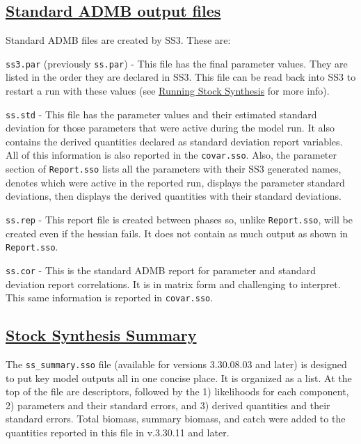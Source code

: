 \hypertarget{ADMBOutput}{}
\subsection[Standard ADMB output files]{\protect\hyperlink{ADMBOutput}{Standard ADMB output files}}
Standard ADMB files are created by SS3. These are:

\texttt{ss3.par} (previously \texttt{ss.par}) - This file has the final parameter values. They are listed in the order they are declared in SS3. This file can be read back into SS3 to restart a run with these values (see \hyperref[sec:RunningSS3]{Running Stock Synthesis} for more info).

\texttt{ss.std} - This file has the parameter values and their estimated standard deviation for those parameters that were active during the model run. It also contains the derived quantities declared as standard deviation report variables. All of this information is also reported in the \texttt{covar.sso}. Also, the parameter section of \texttt{Report.sso} lists all the parameters with their SS3 generated names, denotes which were active in the reported run, displays the parameter standard deviations, then displays the derived quantities with their standard deviations.

\texttt{ss.rep} - This report file is created between phases so, unlike \texttt{Report.sso}, will be created even if the hessian fails. It does not contain as much output as shown in \texttt{Report.sso}.

\texttt{ss.cor} - This is the standard ADMB report for parameter and standard deviation report correlations. It is in matrix form and challenging to interpret. This same information is reported in \texttt{covar.sso}.

\hypertarget{SS3Summary}{}
\subsection[Stock Synthesis Summary]{\protect\hyperlink{SS3Summary}{Stock Synthesis Summary}}
The \texttt{ss\_summary.sso} file (available for versions 3.30.08.03 and later) is designed to put key model outputs all in one concise place. It is organized as a list. At the top of the file are descriptors, followed by the 1) likelihoods for each component, 2) parameters and their standard errors, and 3) derived quantities and their standard errors. Total biomass, summary biomass, and catch were added to the quantities reported in this file in v.3.30.11 and later.


